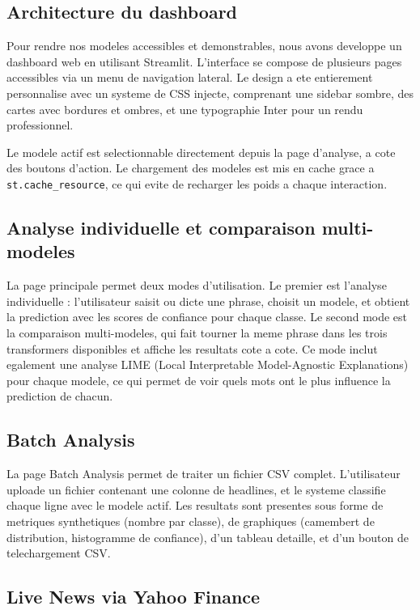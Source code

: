 \documentclass[12pt, a4paper]{article}
\begin{document}
\subsection{Architecture du dashboard}

Pour rendre nos modeles accessibles et demonstrables, nous avons developpe un
dashboard web en utilisant Streamlit. L'interface se compose de plusieurs pages
accessibles via un menu de navigation lateral. Le design a ete entierement
personnalise avec un systeme de CSS injecte, comprenant une sidebar sombre, des
cartes avec bordures et ombres, et une typographie Inter pour un rendu professionnel.

Le modele actif est selectionnable directement depuis la page d'analyse, a cote
des boutons d'action. Le chargement des modeles est mis en cache grace a
\texttt{st.cache\_resource}, ce qui evite de recharger les poids a chaque interaction.

\subsection{Analyse individuelle et comparaison multi-modeles}

La page principale permet deux modes d'utilisation. Le premier est l'analyse
individuelle : l'utilisateur saisit ou dicte une phrase, choisit un modele, et
obtient la prediction avec les scores de confiance pour chaque classe. Le second
mode est la comparaison multi-modeles, qui fait tourner la meme phrase dans les
trois transformers disponibles et affiche les resultats cote a cote. Ce mode
inclut egalement une analyse LIME (Local Interpretable Model-Agnostic Explanations)
pour chaque modele, ce qui permet de voir quels mots ont le plus influence la
prediction de chacun.

\subsection{Batch Analysis}

La page Batch Analysis permet de traiter un fichier CSV complet. L'utilisateur
uploade un fichier contenant une colonne de headlines, et le systeme classifie
chaque ligne avec le modele actif. Les resultats sont presentes sous forme de
metriques synthetiques (nombre par classe), de graphiques (camembert de distribution,
histogramme de confiance), d'un tableau detaille, et d'un bouton de telechargement
CSV.

\subsection{Live News via Yahoo Finance}
\end{document}
